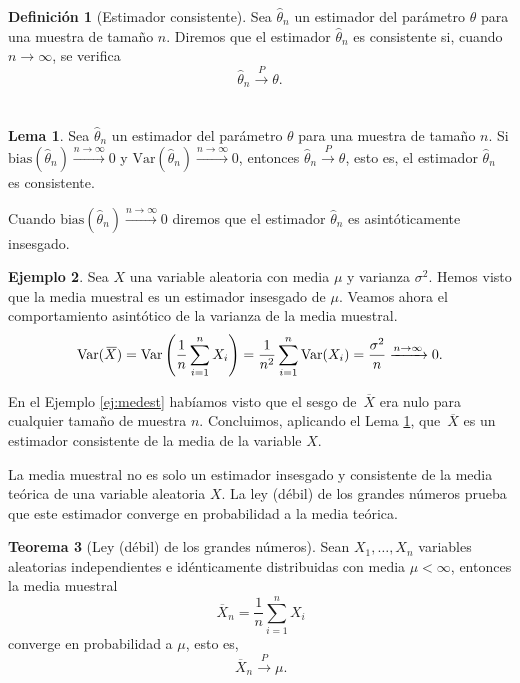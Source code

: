 \documentclass[12pt,a4paper]{report} %
\newcommand{\bias}{\text{bias}}
\newcommand{\Var}{\text{Var}}
\newcommand{\olsi}[1]{\,\overline{\!{#1}}} %
\theoremstyle{definition}
\newtheorem{definition}{Definición}[section]
\newtheorem{theorem}{Teorema}[section]
\newtheorem{lemma}[theorem]{Lema}
\newtheorem{example}[theorem]{Ejemplo}
\begin{document}
\begin{definition}[Estimador consistente]
  Sea $\hat{\theta}_n$ un estimador del parámetro $\theta$ para una muestra de tamaño $n$. Diremos que el estimador $\hat{\theta}_n$ es consistente si, cuando $n\to\infty$, se verifica\[
\hat{\theta}_n\xrightarrow[]{P}\theta.
  \]\\[-10pt]
\end{definition}

\begin{lemma}\label{l:est_cons}
  Sea $\hat{\theta}_n$ un estimador del parámetro $\theta$ para una muestra de tamaño $n$. Si $\bias\left(\hat{\theta}_n\right)\xrightarrow[]{n\to\infty} 0$ y $\Var\left(\hat{\theta}_n\right)\xrightarrow[]{n\to\infty}0$, entonces $\hat{\theta}_n\xrightarrow[]{P}\theta$, esto es, el estimador $\hat{\theta}_n$ es consistente.\\
\end{lemma}

Cuando $\bias\left(\hat{\theta}_n\right)\xrightarrow[]{n\to\infty} 0$ diremos que el estimador $\hat{\theta}_n$ es asintóticamente insesgado.\\

\begin{example}
  Sea $X$ una variable aleatoria con media $\mu$ y varianza $\sigma^2$. Hemos visto que la media muestral es un estimador insesgado de $\mu$. Veamos ahora el comportamiento asintótico de la varianza de la media muestral.\[
\Var(\olsi{X}) = \Var\left(\frac{1}{n}\sum_{i=1}^nX_i\right) = \frac{1}{n^2}\sum_{i=1}^n\Var(X_i) = \frac{\sigma^2}{n}\xrightarrow[]{n\to\infty}0.\\
\]

En el Ejemplo \ref{ej:medest} habíamos visto que el sesgo de $\olsi{X}$ era nulo para cualquier tamaño de muestra $n$. Concluimos, aplicando el Lema \ref{l:est_cons}, que $\olsi{X}$ es un estimador consistente de la media de la variable $X$.\\
\end{example}

La media muestral no es solo un estimador insesgado y consistente de la media teórica de una variable aleatoria $X$. La ley (débil) de los grandes números prueba que este estimador converge en probabilidad a la media teórica.\\

\begin{theorem}[Ley (débil) de los grandes números]\label{t:lgn}
  Sean $X_1,\dots,X_n$ variables aleatorias independientes e idénticamente distribuidas con media $\mu<\infty$, entonces la media muestral\[
\olsi{X}_n = \frac{1}{n}\sum_{i=1}^nX_i
\]converge en probabilidad a $\mu$, esto es,\[
\olsi{X}_n\xrightarrow[]{P} \mu.\]\\  [-10pt]
\end{theorem}
\end{document}
